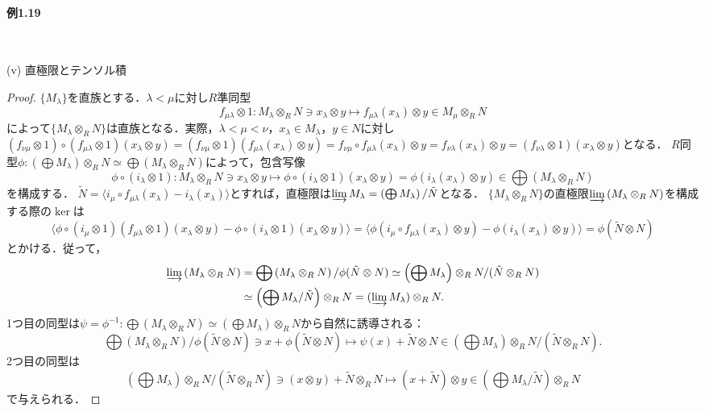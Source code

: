 \paragraph{例1.19}~
\begin{screen}
  (v) 直極限とテンソル積
\end{screen}
\begin{proof}
  $\{M_\lambda\}$を直族とする．$\lambda < \mu$に対し$R$準同型
  \[f_{\mu\lambda} \otimes 1 \colon M_\lambda \otimes_R N \ni x_\lambda \otimes y \mapsto f_{\mu\lambda}(x_\lambda) \otimes y \in M_\mu \otimes_R N\]
  によって$\{M_\lambda \otimes_R N\}$は直族となる．実際，$\lambda < \mu < \nu$，$x_\lambda \in M_\lambda$，$y \in N$に対し$(f_{\nu\mu} \otimes 1) \circ (f_{\mu\lambda} \otimes 1) (x_\lambda \otimes y) = (f_{\nu\mu} \otimes 1)(f_{\mu\lambda}(x_\lambda) \otimes y) = f_{\nu\mu} \circ f_{\mu\lambda} (x_\lambda) \otimes y = f_{\nu\lambda}(x_\lambda) \otimes y = (f_{\nu\lambda} \otimes 1)(x_\lambda \otimes y)$となる．
  $R$同型$\phi\colon (\bigoplus M_\lambda) \otimes_R N \simeq \bigoplus(M_\lambda \otimes_R N)$によって，包含写像
  \[\phi \circ (i_\lambda \otimes 1)\colon M_\lambda \otimes_R N \ni x_\lambda \otimes y \mapsto \phi \circ (i_\lambda \otimes 1)(x_\lambda \otimes y) = \phi (i_\lambda(x_\lambda) \otimes y) \in \bigoplus(M_\lambda \otimes_R N)\]
  を構成する．
  $\tilde{N} = \langle i_\mu \circ f_{\mu\lambda} (x_\lambda) - i_\lambda (x_\lambda) \rangle$とすれば，直極限は$\varinjlim M_\lambda = \left( \bigoplus M_\lambda \right) / \tilde{N}$となる．
  $\{M_\lambda \otimes_R N\}$の直極限$\varinjlim \left( M_\lambda \otimes_R N \right)$を構成する際の$\ker$は
  \[\langle \phi \circ (i_\mu \otimes 1)(f_{\mu\lambda} \otimes 1)(x_\lambda \otimes y) - \phi \circ (i_\lambda \otimes 1)(x_\lambda \otimes y) \rangle = \langle \phi (i_\mu \circ f_{\mu\lambda}(x_\lambda) \otimes y) - \phi (i_\lambda (x_\lambda) \otimes y) \rangle = \phi (\tilde{N} \otimes N) \]
  とかける．従って，
  \begin{align*}
    \varinjlim \left( M_\lambda \otimes_R N \right) &= \bigoplus \left( M_\lambda \otimes_R N \right) / \phi (\tilde{N} \otimes N) \simeq \left( \bigoplus M_\lambda \right) \otimes_R N / (\tilde{N} \otimes_R N) \\
    & \simeq \left( \bigoplus M_\lambda / \tilde{N} \right) \otimes_R N = (\varinjlim M_\lambda) \otimes_R N.
  \end{align*}
  1つ目の同型は$\psi = \phi^{-1} \colon \bigoplus(M_\lambda \otimes_R N) \simeq (\bigoplus M_\lambda) \otimes_R N$から自然に誘導される：
  \[ \bigoplus \left( M_\lambda \otimes_R N \right) / \phi (\tilde{N} \otimes N) \ni x + \phi (\tilde{N} \otimes N) \mapsto \psi(x) + \tilde{N} \otimes N \in \left( \bigoplus M_\lambda \right) \otimes_R N / (\tilde{N} \otimes_R N).\]
  2つ目の同型は
  \[\left( \bigoplus M_\lambda \right) \otimes_R N / (\tilde{N} \otimes_R N) \ni (x \otimes y) + \tilde{N} \otimes_R N \mapsto (x + \tilde{N}) \otimes y \in \left( \bigoplus M_\lambda / \tilde{N} \right) \otimes_R N \]
  で与えられる．
\end{proof}

